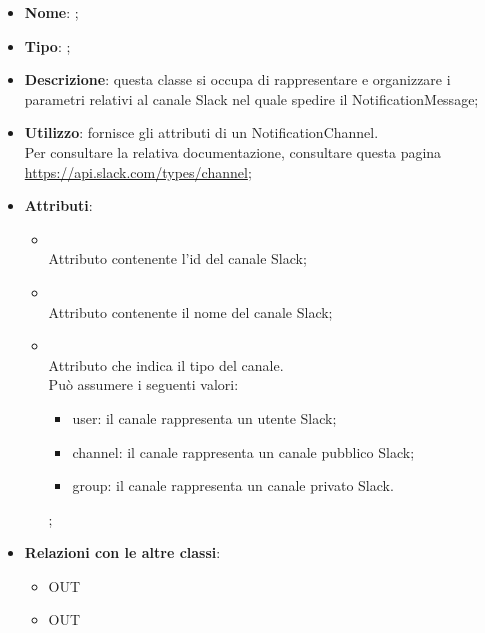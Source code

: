 \begin{itemize}
	\item \textbf{Nome}: ;
	\item \textbf{Tipo}: ;
	\item \textbf{Descrizione}: questa classe si occupa di rappresentare e organizzare i parametri relativi al canale Slack nel quale spedire il NotificationMessage;
	\item \textbf{Utilizzo}: fornisce gli attributi di un NotificationChannel. \\
Per consultare la relativa documentazione, consultare questa pagina \url{https://api.slack.com/types/channel};
	\item \textbf{Attributi}:
	\begin{itemize}
		\item[]  \\
		Attributo contenente l'id del canale Slack;
		\item[]  \\
		Attributo contenente il nome del canale Slack;
		\item[]  \\

		Attributo che indica il tipo del canale. \\ Può assumere i seguenti valori:
\begin{itemize}
  \item user: il canale rappresenta un utente Slack;
  \item channel: il canale rappresenta un canale pubblico Slack;
  \item group: il canale rappresenta un canale privato Slack.
\end{itemize};
	\end{itemize}
	\item \textbf{Relazioni con le altre classi}:
	\begin{itemize}
		\item OUT \hyperlink{Purpose_label}{}
		\item OUT \hyperlink{Topic_label}{}
	\end{itemize}
\end{itemize}
\FloatBarrier


